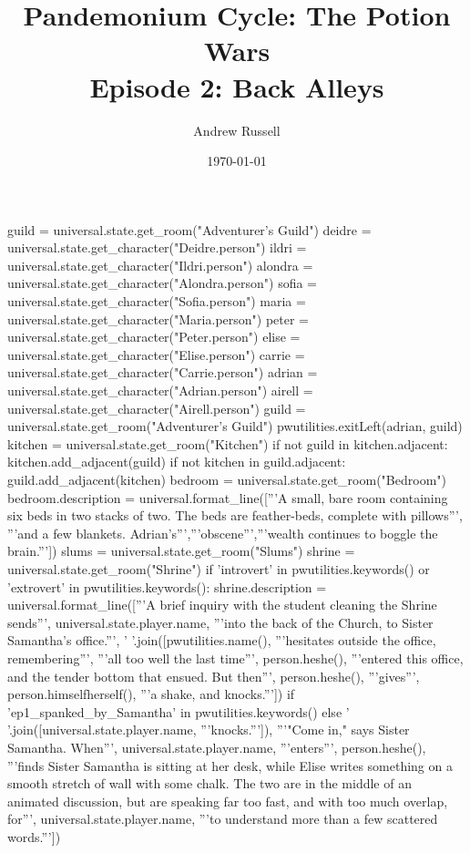 \documentclass{book}
\title{Pandemonium Cycle: The Potion Wars \\ Episode 2: Back Alleys}
\author{Andrew Russell}
\date{\today}
\begin{document}
\maketitle

\begin{openScene}
    guild = universal.state.get_room("Adventurer's Guild")
    deidre = universal.state.get_character("Deidre.person")
    ildri = universal.state.get_character("Ildri.person")
    alondra = universal.state.get_character("Alondra.person")
    sofia = universal.state.get_character("Sofia.person")
    maria = universal.state.get_character("Maria.person")
    peter = universal.state.get_character("Peter.person")
    elise = universal.state.get_character("Elise.person")
    carrie = universal.state.get_character("Carrie.person")
    adrian = universal.state.get_character("Adrian.person")
    airell = universal.state.get_character("Airell.person")
    guild = universal.state.get_room("Adventurer's Guild")
    pwutilities.exitLeft(adrian, guild)
    kitchen = universal.state.get_room("Kitchen")
    if not guild in kitchen.adjacent:
        kitchen.add_adjacent(guild)
    if not kitchen in guild.adjacent:
        guild.add_adjacent(kitchen)
    bedroom = universal.state.get_room("Bedroom")
    bedroom.description = universal.format_line(['''A small, bare room containing six beds in two stacks of two. The beds are feather-beds, complete with pillows''',
        '''and a few blankets. Adrian's''','''obscene''','''wealth continues to boggle the brain.''']) 
    slums = universal.state.get_room("Slums")
    shrine = universal.state.get_room("Shrine")
    if 'introvert' in pwutilities.keywords() or 'extrovert' in pwutilities.keywords():
        shrine.description = universal.format_line(['''A brief inquiry with the student cleaning the Shrine sends''', universal.state.player.name, '''into the back of the Church, to Sister Samantha's office.''', ' '.join([pwutilities.name(), '''hesitates outside the office, remembering''',
            '''all too well the last time''', person.heshe(), '''entered this office, and the tender bottom that ensued. But then''', person.heshe(), '''gives''', person.himselfherself(), '''a shake, and knocks.''']) 
            if 'ep1_spanked_by_Samantha' in pwutilities.keywords() else
        ' '.join([universal.state.player.name, '''knocks.''']), '''"Come in," says Sister Samantha. When''', universal.state.player.name, '''enters''', person.heshe(), '''finds Sister Samantha is sitting at her desk, while Elise writes something on a smooth stretch of wall with some chalk. The two are in the middle of an animated discussion, but are speaking far too fast, and with too much overlap, for''', universal.state.player.name, '''to understand more than a few scattered words.'''])

\end{openScene}
\end{document}
